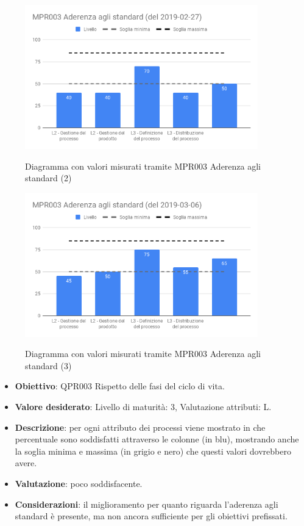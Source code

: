     \begin{figure}[H]
        \centering
        \includegraphics[width=0.9\textwidth]{img/cruscotti/MPR003_(2).png}
        \label{immagineAderenzaStandard2}
        \caption{Diagramma con valori misurati tramite MPR003 Aderenza agli standard (2)}
    \end{figure}
    
    \begin{figure}[H]
        \centering
        \includegraphics[width=0.9\textwidth]{img/cruscotti/MPR003_(3).png}
        \label{immagineAderenzaStandard3}
        \caption{Diagramma con valori misurati tramite MPR003 Aderenza agli standard (3)}
    \end{figure}

	\begin{itemize}
		\item \textbf{Obiettivo}: QPR003 Rispetto delle fasi del ciclo di vita.
		\item \textbf{Valore desiderato}: Livello di maturità: 3, Valutazione attributi: L.
		\item \textbf{Descrizione}: per ogni attributo dei processi viene mostrato in che percentuale sono soddisfatti attraverso le colonne (in blu), mostrando anche la soglia minima e massima (in grigio e nero) che questi valori dovrebbero avere.
		\item \textbf{Valutazione}: poco soddisfacente.
		\item \textbf{Considerazioni}: il miglioramento per quanto riguarda l'aderenza agli standard è presente, ma non ancora sufficiente per gli obiettivi prefissati.
	\end{itemize}
	



